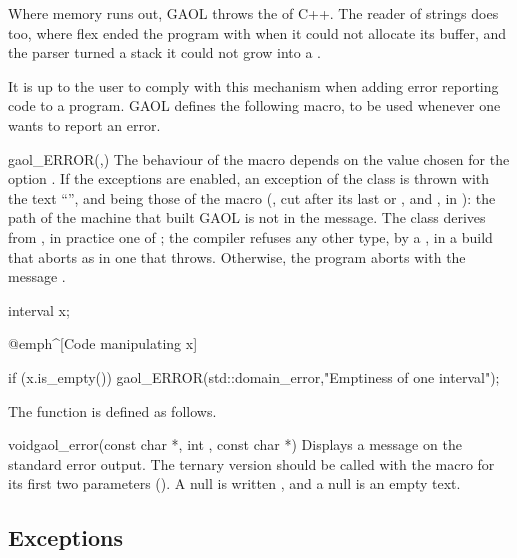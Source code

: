 \documentclass[12pt,a4paper,twoside,openright]{book}
\begin{document}
\medskip
Where memory runs out, GAOL throws the  of C++. The
reader of strings does too, where flex ended the program with 
when it could not allocate its buffer, and the parser turned a stack it could
not grow into a .\newinvfive

\medskip
It is up to the user to comply with this mechanism when adding error
reporting code to a program. GAOL defines the following macro, to be used
whenever one wants to report an error.

\begin{defmacroA}{gaol\_ERROR}{(,)}
  The behaviour of the macro depends on the value chosen for the option
  . If the exceptions are enabled, an exception of
  the class  is thrown with the text
  ``'',  and  being those of
  the macro (, cut after its last \code{/} or
  \code{\textbackslash}, and , in
  ): the path of the machine that built GAOL is not
  in the message. The class  derives from ,
  in practice one of ; the compiler refuses any other type,
  by a , in a build that aborts as in one that throws.
  Otherwise, the program aborts with the message .\newinvfive

\begin{example}
interval x;

@emph^[Code manipulating x]~

if (x.is_empty()) {
   gaol_ERROR(std::domain_error,"Emptiness of one interval");
}
\end{example}
\end{defmacroA}

The function  is defined as follows.

\begin{deffun}{void}{gaol\_error}{(const char *, int ,
const char *)}
Displays a message on the standard error output. The ternary version should
be called with the macro  for its first two parameters
(). A null  is written
, and a null  is an empty text.\newinvfive
\end{deffun}

\subsection{Exceptions}\label{sec:exceptions}
%
%
\end{document}
